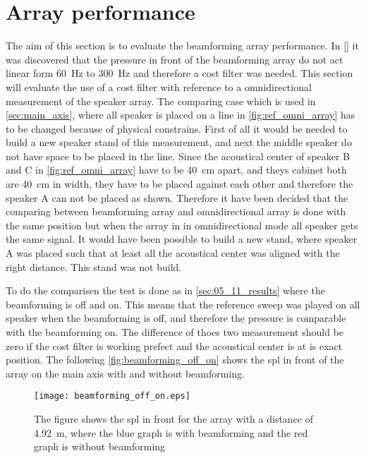 \section{Array performance}

The aim of this section is to evaluate the beamforming array performance. In \autoref{} it was discovered that the pressure in front of the beamforming array do not act linear form \SI{60}{\hertz} to \SI{300}{\hertz} and therefore a cost filter was needed. This section will evaluate the use of a cost filter with reference to a omnidirectional measurement of the speaker array. The comparing case which is used in \autoref{sec:main_axis}, where all speaker is placed on a line in \autoref{fig:ref_omni_array} has to be changed because of physical constrains. First of all it would be needed to build a new speaker stand of this measurement, and next the middle speaker do not have space to be placed in the line. Since the acoustical center of speaker B and C in \autoref{fig:ref_omni_array} have to be \SI{40}{\centi\meter} apart, and theys cabinet both are \SI{40}{\centi\meter} in width, they have to be placed against each other and therefore the speaker A can not be placed as shown. Therefore it have been decided that the comparing between beamforming array and omnidirectional array is done with the same position but when the array in in omnidirectional mode all speaker gets the same signal. It would have been possible to build a new stand, where speaker A was placed such that at  least all the acoustical center was aligned with the right distance. This stand was not build.

To do the comparisen the test is done as in \autoref{sec:05_11_results} where the beamforming is off and on. This means that the reference sweep was played on all speaker when the beamforming is off, and therefore the pressure is comparable with the beamforming on. The difference of thoes two measurement should be zero if the cost filter is working prefect and the acoustical center is at is exact position. The following \autoref{fig:beamforming_off_on} shows the \gls{spl} in front of the array on the main axis with and without beamforming.

  \begin{figure}[H]
	\centering
	\texttt{[image: beamforming\_off\_on.eps]}
	\caption{The figure shows the \gls{spl} in front for the array with a distance of \SI{4.92}{\meter}, where the blue graph is with beamforming and the red graph is without beamforming}
		\label{fig:beamforming_off_on}
\end{figure}


